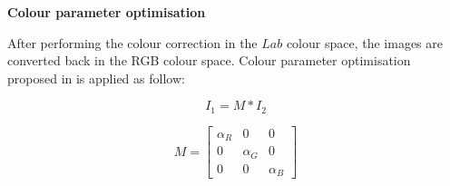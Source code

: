 \textbf{Colour parameter optimisation}
\label{section:colour parameter optimisation}

After performing the colour correction in the $Lab$ colour space, the images are converted back in the RGB colour space. Colour parameter optimisation proposed in \cite{dasari_reference_2016} is applied as follow: 

\begin{equation}
    I_{1}=M * I_{2
\label{equation:parameter_optimization}}
\end{equation}


\begin{equation}
    M=\left[\begin{array}{ccc}
    {\alpha_{R}} & {0} & {0} \\
    {0} & {\alpha_{G}} & {0} \\
    {0} & {0} & {\alpha_{B}}
\end{array}\right]
\end{equation}


